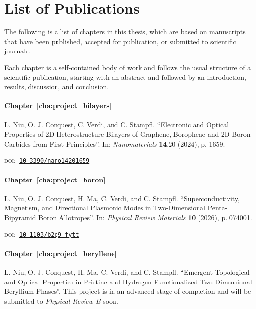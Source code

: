 \chapter*{List of Publications}

The following is a list of chapters in this thesis,
which are based on manuscripts that have been published,
accepted for publication,
or submitted to scientific journals.

Each chapter is a self-contained body of work and follows the usual structure of a scientific publication,
starting with an abstract and followed by an introduction, results, discussion, and conclusion.

\par\vspace{\baselineskip}

\subsubsection*{Chapter~\ref{cha:project_bilayers}}

L. Niu, O. J. Conquest, C. Verdi, and C. Stampfl.
``Electronic and Optical Properties of 2D Heterostructure Bilayers of Graphene, Borophene and 2D Boron Carbides from First Principles''.
In: \textit{Nanomaterials} \textbf{14}.20 (2024), p. 1659.
\par\textsc{doi}:~\href{https://doi.org/10.3390/nano14201659}{\texttt{10.3390/nano14201659}}

\subsubsection*{Chapter~\ref{cha:project_boron}}

L. Niu, O. J. Conquest, H. Ma, C. Verdi, and C. Stampfl.
``Superconductivity, Magnetism, and Directional Plasmonic Modes in Two-Dimensional Penta-Bipyramid Boron Allotropes''.
In: \textit{Physical Review Materials} \textbf{10} (2026), p. 074001.
\par\textsc{doi}:~\href{https://doi.org/10.1103/b2q9-fytt}{\texttt{10.1103/b2q9-fytt}}

\subsubsection*{Chapter~\ref{cha:project_beryllene}}

L. Niu, O. J. Conquest, H. Ma, C. Verdi, and C. Stampfl.
``Emergent Topological and Optical Properties in Pristine and Hydrogen-Functionalized Two-Dimensional Beryllium Phases''.
This project is in an advanced stage of completion and will be submitted to \textit{Physical Review B} soon.

